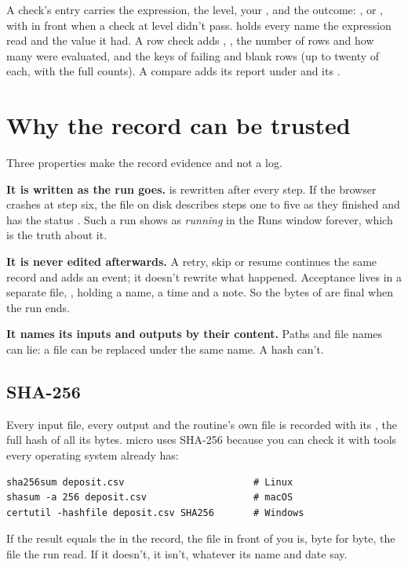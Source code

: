 A check's entry carries the expression, the level, your , and the outcome: ,  or , with  in front when a check at level  didn't pass.  holds every name the expression read and the value it had. A row check adds , , the number of rows and how many were evaluated, and the keys of failing and blank rows (up to twenty of each, with the full counts). A compare adds its report under  and its .

\section{Why the record can be trusted}\label{sec:records-trust}
Three properties make the record evidence and not a log.

\textbf{It is written as the run goes.}  is rewritten after every step. If the browser crashes at step six, the file on disk describes steps one to five as they finished and has the status . Such a run shows as \emph{running} in the Runs window forever, which is the truth about it.

\textbf{It is never edited afterwards.} A retry, skip or resume continues the same record and adds an event; it doesn't rewrite what happened. Acceptance lives in a separate file, , holding a name, a time and a note. So the bytes of  are final when the run ends.

\textbf{It names its inputs and outputs by their content.} Paths and file names can lie: a file can be replaced under the same name. A hash can't.

\subsection{SHA-256}\label{sec:records-sha}
Every input file, every output and the routine's own file is recorded with its , the full hash of all its bytes. micro uses SHA-256 because you can check it with tools every operating system already has:

\begin{lstlisting}
sha256sum deposit.csv                       # Linux
shasum -a 256 deposit.csv                   # macOS
certutil -hashfile deposit.csv SHA256       # Windows
\end{lstlisting}

If the result equals the  in the record, the file in front of you is, byte for byte, the file the run read. If it doesn't, it isn't, whatever its name and date say.


